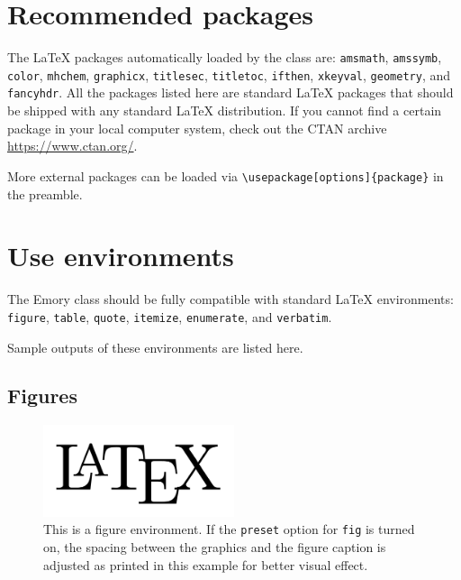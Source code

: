 \documentclass[draft]{emory}
\begin{document}
\section{Recommended packages}
The \LaTeX{} packages automatically loaded by the class are: \Verb|amsmath|, 
\Verb|amssymb|, \Verb|color|, \Verb|mhchem|, \Verb|graphicx|, \Verb|titlesec|, 
\Verb|titletoc|, \Verb|ifthen|, \Verb|xkeyval|, \Verb|geometry|, and 
\Verb|fancyhdr|. All the packages listed here are standard \LaTeX{} packages 
that should be shipped with any standard \LaTeX{} distribution. If you cannot 
find a certain package in your local computer system, check out the CTAN 
archive \url{https://www.ctan.org/}.

More external packages can be loaded via \Verb|\usepackage[options]{package}|
in the preamble. 


\section{Use environments}\label{sec:env}
The Emory class should be fully compatible with standard \LaTeX{} environments:
\Verb|figure|, \Verb|table|, \Verb|quote|, \Verb|itemize|, \Verb|enumerate|,
and \Verb|verbatim|.

Sample outputs of these environments are listed here. 

\subsection{Figures}

\begin{figure}[htp!]
  \centering
  \includegraphics[width=0.5\textwidth]{LaTeXLogo.png}
  \caption[This is a figure environment]{This is a figure 
  environment.\label{fig} If the \protect\Verb|preset| option 
  for \protect\Verb|fig| is turned on, the spacing between the graphics and the 
  figure caption is adjusted as printed in this example for better visual 
  effect.}
\end{figure}
\end{document}

